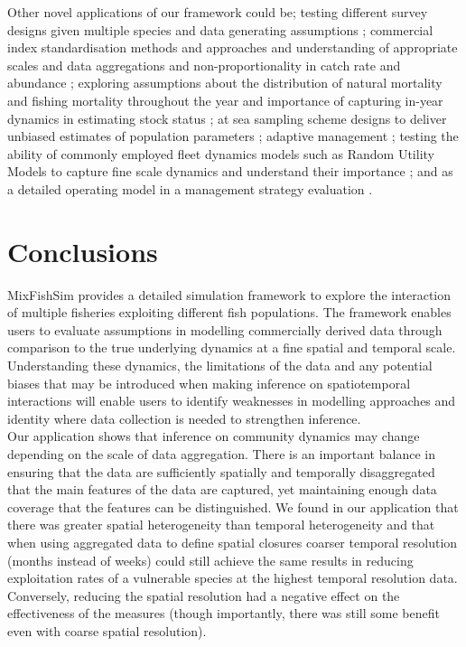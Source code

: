\documentclass[review]{elsarticle}
\begin{document}
Other novel applications of our framework could be; testing different survey
designs given multiple species and data generating assumptions \citep{Xu2015};
commercial index standardisation methods and approaches and understanding of
appropriate scales and data aggregations and non-proportionality in catch rate
and abundance \citep{Harley2001, Maunder2004}; exploring assumptions about the
distribution of natural mortality and fishing mortality throughout the year and
importance of capturing in-year dynamics in estimating stock status
\citep{Liu2013}; at sea sampling scheme designs to deliver unbiased estimates
of population parameters \cite{Cotter2007, Kimura2006}; adaptive management
\citep{Walters2007, Dunn2016}; testing the ability of commonly employed fleet
dynamics models such as Random Utility Models to capture fine scale dynamics
and understand their importance \cite{Girardin2016}; and as a detailed
operating model in a management strategy evaluation \cite{Mahevas2004}. \\

\section{Conclusions}

MixFishSim provides a detailed simulation framework to explore the interaction
of multiple fisheries exploiting different fish populations. The framework
enables users to evaluate assumptions in modelling commercially derived data
through comparison to the true underlying dynamics at a fine spatial and
temporal scale.  Understanding these dynamics, the limitations of the data and
any potential biases that may be introduced when making inference on
spatiotemporal interactions will enable users to identify weaknesses in
modelling approaches and identity where data collection is needed to strengthen
inference. \\

Our application shows that inference on community dynamics may change depending
on the scale of data aggregation. There is an important balance in ensuring
that the data are sufficiently spatially and temporally disaggregated that the
main features of the data are captured, yet maintaining enough data coverage
that the features can be distinguished. We found in our application that there
was greater spatial heterogeneity than temporal heterogeneity and that when
using aggregated data to define spatial closures coarser temporal resolution
(months instead of weeks) could still achieve the same results in reducing
exploitation rates of a vulnerable species at the highest temporal resolution
data. Conversely, reducing the spatial resolution had a negative effect on the
effectiveness of the measures (though importantly, there was still some benefit
even with coarse spatial resolution). \\
\end{document}
